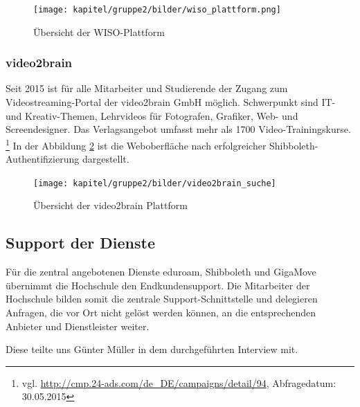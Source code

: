 \begin{figure}[h!]
	\centering
	\texttt{[image: kapitel/gruppe2/bilder/wiso\_plattform.png]}
	\caption{Übersicht der WISO-Plattform \protect\footnotemark}
	\label{fig_wiso_plattform.png}
\end{figure}

\subsubsection{video2brain}
Seit 2015 ist für alle Mitarbeiter und Studierende der Zugang zum Videostreaming-Portal der video2brain GmbH möglich. Schwerpunkt sind IT- und Kreativ-Themen, Lehrvideos für Fotografen, Grafiker, Web- und Screendesigner. Das Verlagsangebot umfasst mehr als 1700 Video-Trainingskurse. \footnote{vgl. \url{http://cmp.24-ads.com/de_DE/campaigns/detail/94}, Abfragedatum: 30.05.2015} In der Abbildung \ref{fig_video2brain_suchergebnis} ist die Weboberfläche nach erfolgreicher Shibboleth-Authentifizierung dargestellt.

\begin{figure}[h!]
	\centering
	\texttt{[image: kapitel/gruppe2/bilder/video2brain\_suche]}
	\caption{Übersicht der video2brain Plattform \protect\footnotemark}
	\label{fig_video2brain_suchergebnis}
\end{figure}

\subsection{Support der Dienste}
Für die zentral angebotenen Dienste eduroam, Shibboleth und GigaMove übernimmt die Hochschule den Endkundensupport. Die Mitarbeiter der Hochschule bilden somit die zentrale Support-Schnittstelle und delegieren Anfragen, die vor Ort nicht gelöst werden können, an die entsprechenden Anbieter und Dienstleister weiter.

Diese teilte uns Günter Müller in dem durchgeführten Interview mit.